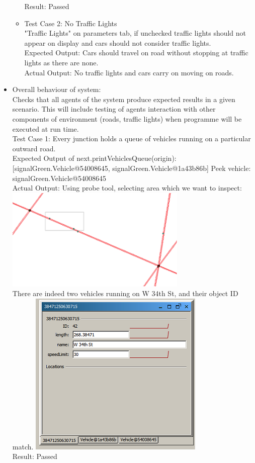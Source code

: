 \documentclass[11pt, oneside]{article}   	%
\begin{document}
\begin{itemize}
\begin{itemize}
Result: Passed
\item Test Case 2: No Traffic Lights\hfill \\
"Traffic Lights" on parameters tab, if unchecked traffic lights should not appear on display and cars should not consider traffic lights.\hfill \\
Expected Output: Cars should travel on road without stopping at traffic lights as there are none.\hfill \\
Actual Output: No traffic lights and cars carry on moving on roads.
\end{itemize}
\item Overall behaviour of system: \hfill \\
Checks that all agents of the system produce expected results in a given scenario. This will include testing of agents interaction with other components of environment (roads, traffic lights) when programme will be executed at run time.\hfill \\
Test Case 1: Every junction holds a queue of vehicles running on a particular outward road.\hfill \\
Expected Output of next.printVehiclesQueue(origin):[signalGreen.Vehicle@54008645, signalGreen.Vehicle@1a43b86b] Peek vehicle: signalGreen.Vehicle@54008645\hfill \\
Actual Output: Using probe tool, selecting area which we want to inspect:\hfill \\
\includegraphics{RoadNetwork}\hfill \\
There are indeed two vehicles running on W 34th St, and their object ID match.
\includegraphics{Sim}\hfill \\
Result: Passed
\end{itemize}
\end{document}
